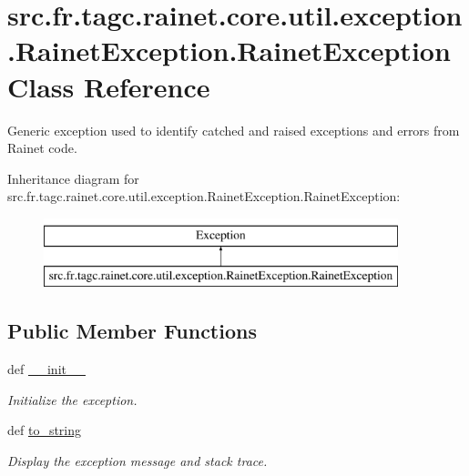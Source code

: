 \hypertarget{classsrc_1_1fr_1_1tagc_1_1rainet_1_1core_1_1util_1_1exception_1_1RainetException_1_1RainetException}{\section{src.\-fr.\-tagc.\-rainet.\-core.\-util.\-exception.\-Rainet\-Exception.\-Rainet\-Exception Class Reference}
\label{classsrc_1_1fr_1_1tagc_1_1rainet_1_1core_1_1util_1_1exception_1_1RainetException_1_1RainetException}
}


Generic exception used to identify catched and raised exceptions and errors from Rainet code.  


Inheritance diagram for src.\-fr.\-tagc.\-rainet.\-core.\-util.\-exception.\-Rainet\-Exception.\-Rainet\-Exception\-:\begin{figure}[H]
\begin{center}
\leavevmode
\includegraphics[height=2.000000cm]{classsrc_1_1fr_1_1tagc_1_1rainet_1_1core_1_1util_1_1exception_1_1RainetException_1_1RainetException}
\end{center}
\end{figure}
\subsection*{Public Member Functions}
\begin{DoxyCompactItemize}
\item 
def \hyperlink{classsrc_1_1fr_1_1tagc_1_1rainet_1_1core_1_1util_1_1exception_1_1RainetException_1_1RainetException_aacef80ab04c0067ea376b4dc436c3ba7}{\-\_\-\-\_\-init\-\_\-\-\_\-}
\begin{DoxyCompactList}\small\item\em Initialize the exception. \end{DoxyCompactList}\item 
\hypertarget{classsrc_1_1fr_1_1tagc_1_1rainet_1_1core_1_1util_1_1exception_1_1RainetException_1_1RainetException_a920040054fd47002261f5e25ee954763}{def \hyperlink{classsrc_1_1fr_1_1tagc_1_1rainet_1_1core_1_1util_1_1exception_1_1RainetException_1_1RainetException_a920040054fd47002261f5e25ee954763}{to\-\_\-string}}\label{classsrc_1_1fr_1_1tagc_1_1rainet_1_1core_1_1util_1_1exception_1_1RainetException_1_1RainetException_a920040054fd47002261f5e25ee954763}

\begin{DoxyCompactList}\small\item\em Display the exception message and stack trace. \end{DoxyCompactList}\end{DoxyCompactItemize}
